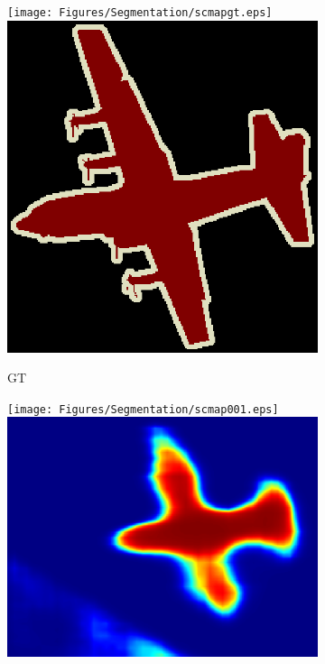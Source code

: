\begin{figure}[!hb]
	\hfill
	\begin{subfigure}{0.19\linewidth}
		\texttt{[image: Figures/Segmentation/scmapgt.eps]}\\
		\includegraphics[width=\linewidth]{Figures/Segmentation/beliefgt.eps}
		\caption{GT}
	\end{subfigure}
	\hfill
	\begin{subfigure}{0.19\linewidth}
		\texttt{[image: Figures/Segmentation/scmap001.eps]}\\
		\includegraphics[width=\linewidth]{Figures/Segmentation/belief001.eps}

\end{subfigure}
\end{figure}
